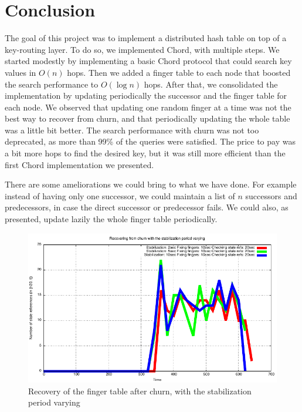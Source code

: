 \documentclass[a4paper, 11pt]{article}
\theoremstyle{plain}
\theoremstyle{definition}
\begin{document}
\section{Conclusion}
\label{sec:conclusion}

  The goal of this project was to implement a distributed hash table on top of a key-routing layer. To do so,
  we implemented Chord, with multiple steps. We started modestly by implementing a basic Chord protocol that
  could search key values in $O(n)$ hops. Then we added a finger table to each node that boosted the search
  performance to $O(\log n)$ hops. After that, we consolidated the implementation by updating periodically the
  successor and the finger table for each node. We observed that updating one random finger at a time was not
  the best way to recover from churn, and that periodically updating the whole table was a little bit
  better. The search performance with churn was not too deprecated, as more than 99\% of the queries were
  satisfied. The price to pay was a bit more hops to find the desired key, but it was still more efficient
  than the first Chord implementation we presented.

  There are some ameliorations we could bring to what we have done. For example instead of having only one
  successor, we could maintain a list of $n$ successors and predecessors, in case the direct successor or
  predecessor fails. We could also, as presented, update lazily the whole finger table periodically. 

    \begin{figure}[h]
      \centering
      \includegraphics{plots/Recovery-SR-stabilization.pdf}
      \caption{Recovery of the finger table after churn, with the stabilization period varying}
      \label{fig:Rec-SR-stab}
    \end{figure}
    
\end{document}
